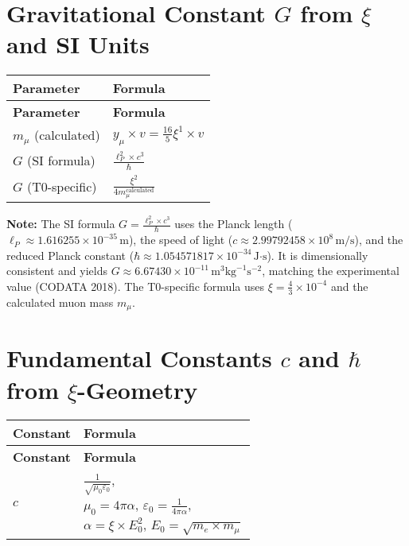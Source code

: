 \documentclass[12pt,a4paper]{article}
\begin{document}
	\section{Gravitational Constant $G$ from $\xi$ and SI Units}
	\begin{longtable}{|p{5cm}|p{6cm}|}
		\hline
		\textbf{Parameter} & \textbf{Formula} \\
		\hline
		\endfirsthead
		\hline
		\textbf{Parameter} & \textbf{Formula} \\
		\hline
		\endhead
		$m_{\mu}$ (calculated) & $y_{\mu} \times v = \frac{16}{5}\xi^{1} \times v$ \\
		\hline
		$G$ (SI formula) & $\frac{\ell_P^2 \times c^3}{\hbar}$ \\
		\hline
		$G$ (T0-specific) & $\frac{\xi^{2}}{4m_{\mu}^{\text{calculated}}}$ \\
		\hline
	\end{longtable}
	
	\textbf{Note:} The SI formula $G = \frac{\ell_P^2 \times c^3}{\hbar}$ uses the Planck length ($\ell_P \approx 1.616255 \times 10^{-35} \, \text{m}$), the speed of light ($c \approx 2.99792458 \times 10^8 \, \text{m/s}$), and the reduced Planck constant ($\hbar \approx 1.054571817 \times 10^{-34} \, \text{J·s}$). It is dimensionally consistent and yields $G \approx 6.67430 \times 10^{-11} \, \text{m}^3 \text{kg}^{-1} \text{s}^{-2}$, matching the experimental value (CODATA 2018). The T0-specific formula uses $\xi = \frac{4}{3} \times 10^{-4}$ and the calculated muon mass $m_\mu$.
	
	\section{Fundamental Constants $c$ and $\hbar$ from $\xi$-Geometry}
	\begin{longtable}{|p{5cm}|p{6cm}|}
		\hline
		\textbf{Constant} & \textbf{Formula} \\
		\hline
		\endfirsthead
		\hline
		\textbf{Constant} & \textbf{Formula} \\
		\hline
		\endhead
		$c$ & \parbox{6cm}{\centering $\frac{1}{\sqrt{\mu_0 \varepsilon_0}}$, \\ $\mu_0 = 4\pi\alpha$, $\varepsilon_0 = \frac{1}{4\pi\alpha}$, \\ $\alpha = \xi \times E_0^2$, $E_0 = \sqrt{m_e \times m_\mu}$} \\
		\hline
		$\hbar$ & $\frac{e^2}{4\pi \alpha^2 c \varepsilon_0}$ \\
		\hline
	\end{longtable}
	
\end{document}
